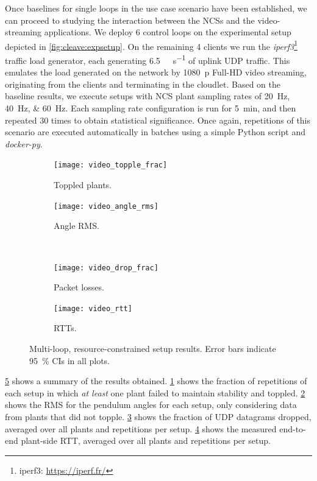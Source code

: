 Once baselines for single loops in the use case scenario have been established, we can proceed to studying the interaction between the \acp{NCS} and the video-streaming applications.
We deploy \num{6} control loops on the experimental setup depicted in \cref{fig:cleave:expsetup}.
On the remaining \num{4} clients we run the \emph{iperf3}\footnote{iperf3: \url{https://iperf.fr/}} traffic load generator, each generating \SI[per-mode=symbol]{6.5}{\mega\bit\per\second} of uplink \ac{UDP} traffic.
This emulates the load generated on the network by \SI{1080}{p} Full-HD video streaming, originating from the clients and terminating in the cloudlet.
Based on the baseline results, we execute setups with \ac{NCS} plant sampling rates of \SIlist{20;40;60}{\hertz}.
Each sampling rate configuration is run for \SI{5}{\minute}, and then repeated \num{30} times to obtain statistical significance.
Once again, repetitions of this scenario are executed automatically in batches using a simple Python script and \emph{docker-py}.

\begin{figure}[t]
    \centering
    \begin{subfigure}[h]{.22\textwidth}
        \centering
        \texttt{[image: video\_topple\_frac]}
        \caption{Toppled plants.}\label{fig:video:toppled}
    \end{subfigure}%
    \hfill%
    \begin{subfigure}[h]{.22\textwidth}
        \centering
        \texttt{[image: video\_angle\_rms]}
        \caption{Angle \ac{RMS}.}\label{fig:video:rms}
    \end{subfigure}\\
    \begin{subfigure}[h]{.22\textwidth}
        \centering
        \texttt{[image: video\_drop\_frac]}
        \caption{Packet losses.}\label{fig:video:drop}
    \end{subfigure}%
    \hfill%
    \begin{subfigure}[h]{.22\textwidth}
        \centering
        \texttt{[image: video\_rtt]}
        \caption{\acsp{RTT}.}\label{fig:video:rtt}
    \end{subfigure}%
    \caption{
        Multi-loop, resource-constrained setup results.
        Error bars indicate \SI{95}{\percent} \acp{CI} in all plots.
    }\label{fig:video:results}
\end{figure}

\cref{fig:video:results} shows a summary of the results obtained.
\cref{fig:video:toppled} shows the fraction of repetitions of each setup in which \emph{at least} one plant failed to maintain stability and toppled.
\cref{fig:video:rms} shows the \ac{RMS} for the pendulum angles for each setup, only considering data from plants that did not topple.
\cref{fig:video:drop} shows the fraction of \ac{UDP} datagrams dropped, averaged over all plants and repetitions per setup.
\cref{fig:video:rtt} shows the measured end-to-end plant-side \ac{RTT}, averaged over all plants and repetitions per setup.

